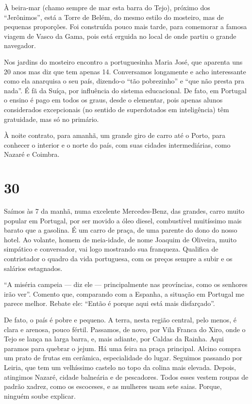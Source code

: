 À beira-mar (chamo sempre de mar esta barra do Tejo), próximo dos ``Jerônimos'', está a Torre de Belém, do mesmo estilo do mosteiro, mas de pequenas proporções. Foi construída pouco mais tarde, para comemorar a famosa viagem de Vasco da Gama, pois está erguida no local de onde partiu o grande navegador.

Nos jardins do mosteiro encontro a portuguesinha Maria José, que aparenta uns 20 anos mas diz que tem apenas 14. Conversamos longamente e acho interessante como ela anarquisa o seu país, dizendo-o ``tão pobrezinho'' e ``que não presta pra nada''. É fã da Suíça, por influência do sistema educacional. De fato, em Portugal o ensino é pago em todos os graus, desde o elementar, pois apenas alunos considerados excepcionais (no sentido de superdotados em inteligência) têm gratuidade, mas só no primário.

À noite contrato, para amanhã, um grande giro de carro até o Porto, para conhecer o interior e o norte do país, com suas cidades intermediárias, como Nazaré e Coimbra.

\section*{30 \adfflatleafright {}}
Saímos às 7 da manhã, numa excelente Mercedes-Benz, das grandes, carro muito popular em Portugal, por ser movido a óleo diesel, combustível muitíssimo mais barato que a gasolina. É um carro de praça, de uma parente do dono do nosso hotel. Ao volante, homem de meia-idade, de nome Joaquim de Oliveira, muito simpático e conversador, vai logo mostrando sua franqueza. Qualifica de contristador o quadro da vida portuguesa, com os preços sempre a subir e os salários estagnados.

``A miséria campeia --- diz ele --- principalmente nas províncias, como os senhores irão ver''. Comento que, comparando com a Espanha, a situação em Portugal me parece melhor. Rebate ele: ``Então é porque aqui está mais disfarçado''.

De fato, o país é pobre e pequeno. A terra, nesta região central, pelo menos, é clara e arenosa, pouco fértil. Passamos, de novo, por Vila Franca do Xiro, onde o Tejo se lança na larga barra, e, mais adiante, por Caldas da Rainha. Aqui paramos para quebrar o jejum. Há uma feira na praça principal. Alcino compra um prato de frutas em cerâmica, especialidade do lugar. Seguimos passando por Leiria, que tem um velhíssimo castelo no topo da colina mais elevada. Depois, atingimos Nazaré, cidade balneária e de pescadores. Todos esses vestem roupas de padrão xadrez, como os escoceses, e as mulheres usam sete saias. Porque, ninguém soube explicar.

